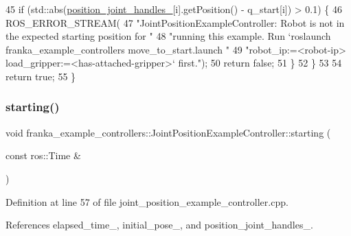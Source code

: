 \begin{DoxyCode}
45     \textcolor{keywordflow}{if} (std::abs(\hyperlink{classfranka__example__controllers_1_1JointPositionExampleController_acaa5902db27586e01e48939526e27e5a}{position\_joint\_handles\_}[i].getPosition() - q\_start[i]) > 0.1) \{
46       ROS\_ERROR\_STREAM(
47           \textcolor{stringliteral}{"JointPositionExampleController: Robot is not in the expected starting position for "}
48           \textcolor{stringliteral}{"running this example. Run `roslaunch franka\_example\_controllers move\_to\_start.launch "}
49           \textcolor{stringliteral}{"robot\_ip:=<robot-ip> load\_gripper:=<has-attached-gripper>` first."});
50       \textcolor{keywordflow}{return} \textcolor{keyword}{false};
51     \}
52   \}
53 
54   \textcolor{keywordflow}{return} \textcolor{keyword}{true};
55 \}
\end{DoxyCode}
\mbox{\label{classfranka__example__controllers_1_1JointPositionExampleController_a2b8711e7421963f686c7383d624e38a8}} 
\subsubsection{\texorpdfstring{starting()}{starting()}}
{\footnotesize\ttfamily void franka\+\_\+example\+\_\+controllers\+::\+Joint\+Position\+Example\+Controller\+::starting (\begin{DoxyParamCaption}\item[{const ros\+::\+Time \&}]{ }\end{DoxyParamCaption})\hspace{0.3cm}{\ttfamily [override]}}



Definition at line 57 of file joint\+\_\+position\+\_\+example\+\_\+controller.\+cpp.



References elapsed\+\_\+time\+\_\+, initial\+\_\+pose\+\_\+, and position\+\_\+joint\+\_\+handles\+\_\+.


